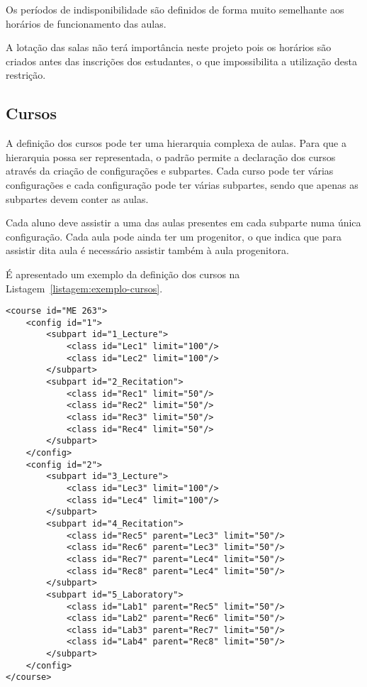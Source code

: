 Os períodos de indisponibilidade são definidos de forma muito semelhante aos horários de funcionamento das aulas.

A lotação das salas não terá importância neste projeto pois os horários são criados antes das inscrições dos estudantes, o que impossibilita a utilização desta restrição.

\subsection{Cursos}

A definição dos cursos pode ter uma hierarquia complexa de aulas. Para que a hierarquia possa ser representada, o padrão permite a declaração dos cursos através da criação de configurações e subpartes. Cada curso pode ter várias configurações e cada configuração pode ter várias subpartes, sendo que apenas as subpartes devem conter as aulas.

Cada aluno deve assistir a uma das aulas presentes em cada subparte numa única configuração. Cada aula pode ainda ter um progenitor, o que indica que para assistir dita aula é necessário assistir também à aula progenitora.

É apresentado um exemplo da definição dos cursos na Listagem~\ref{listagem:exemplo-cursos}.

\begin{minipage}[c]{\linewidth}
    \begin{lstlisting}[caption={Exemplo da definição dos cursos.}, label={listagem:exemplo-cursos}]
<course id="ME 263">
    <config id="1">
        <subpart id="1_Lecture">
            <class id="Lec1" limit="100"/>
            <class id="Lec2" limit="100"/>
        </subpart>
        <subpart id="2_Recitation">
            <class id="Rec1" limit="50"/>
            <class id="Rec2" limit="50"/>
            <class id="Rec3" limit="50"/>
            <class id="Rec4" limit="50"/>
        </subpart>
    </config>
    <config id="2">
        <subpart id="3_Lecture">
            <class id="Lec3" limit="100"/>
            <class id="Lec4" limit="100"/>
        </subpart>
        <subpart id="4_Recitation">
            <class id="Rec5" parent="Lec3" limit="50"/>
            <class id="Rec6" parent="Lec3" limit="50"/>
            <class id="Rec7" parent="Lec4" limit="50"/>
            <class id="Rec8" parent="Lec4" limit="50"/>
        </subpart>
        <subpart id="5_Laboratory">
            <class id="Lab1" parent="Rec5" limit="50"/>
            <class id="Lab2" parent="Rec6" limit="50"/>
            <class id="Lab3" parent="Rec7" limit="50"/>
            <class id="Lab4" parent="Rec8" limit="50"/>
        </subpart>
    </config>
</course>
    \end{lstlisting}
\end{minipage}

